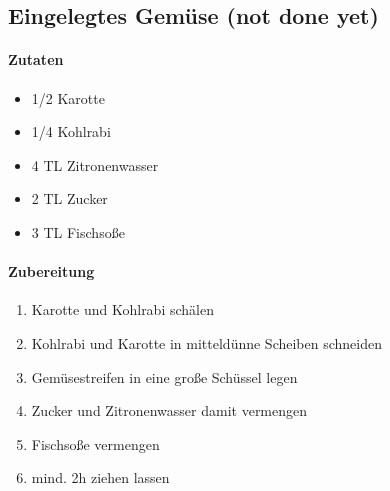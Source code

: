 \newpage
\subsection{Eingelegtes Gemüse (not done yet)}
\paragraph{Zutaten}
\begin{itemize}[noitemsep]
	\item 1/2 Karotte
	\item 1/4 Kohlrabi
	\item 4 TL Zitronenwasser 
	\item 2 TL Zucker
	\item 3 TL Fischsoße
\end{itemize}
\paragraph{Zubereitung}
\begin{enumerate}[noitemsep]
	\item Karotte und Kohlrabi schälen
	\item Kohlrabi und Karotte in mitteldünne Scheiben schneiden
	\item Gemüsestreifen in eine große Schüssel legen
	\item Zucker und Zitronenwasser damit vermengen
	\item Fischsoße vermengen
	\item mind. 2h ziehen lassen
\end{enumerate}